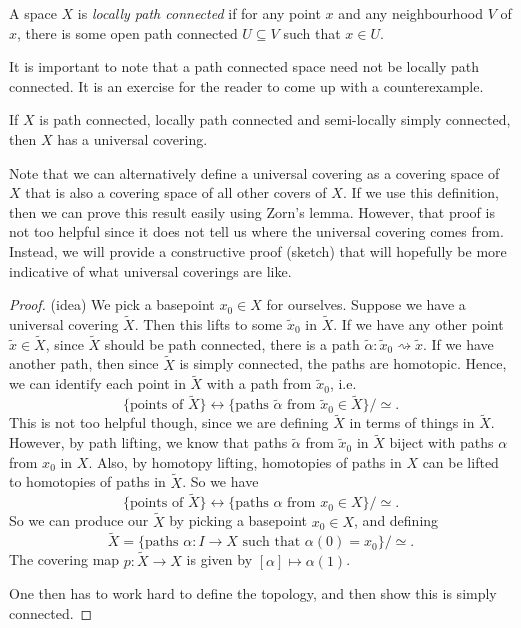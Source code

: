 \documentclass[a4paper]{article}
\begin{document}
\begin{defi}
  A space $X$ is \emph{locally path connected} if for any point $x$ and any neighbourhood $V$ of $x$, there is some open path connected $U \subseteq V$ such that $x \in U$.
\end{defi}

It is important to note that a path connected space need not be locally path connected. It is an exercise for the reader to come up with a counterexample.

\begin{thm}
  If $X$ is path connected, locally path connected and semi-locally simply connected, then $X$ has a universal covering.
\end{thm}
Note that we can alternatively define a universal covering as a covering space of $X$ that is also a covering space of all other covers of $X$. If we use this definition, then we can prove this result easily using Zorn's lemma. However, that proof is not too helpful since it does not tell us where the universal covering comes from. Instead, we will provide a constructive proof (sketch) that will hopefully be more indicative of what universal coverings are like.

\begin{proof}(idea)
  We pick a basepoint $x_0 \in X$ for ourselves. Suppose we have a universal covering $\tilde{X}$. Then this lifts to some $\tilde{x}_0$ in $\tilde{X}$. If we have any other point $\tilde{x} \in \tilde{X}$, since $\tilde{X}$ should be path connected, there is a path $\tilde{\alpha}: \tilde{x}_0 \rightsquigarrow \tilde{x}$. If we have another path, then since $\tilde{X}$ is simply connected, the paths are homotopic. Hence, we can identify each point in $\tilde{X}$ with a path from $\tilde{x}_0$, i.e.
  \[
    \{\text{points of }\tilde{X}\} \longleftrightarrow \{\text{paths }\tilde{\alpha}\text{ from }\tilde{x}_0\in \tilde{X}\}/{\simeq}.
  \]
  This is not too helpful though, since we are defining $\tilde{X}$ in terms of things in $\tilde{X}$. However, by path lifting, we know that paths $\tilde{\alpha}$ from $\tilde{x}_0$ in $\tilde{X}$ biject with paths $\alpha$ from $x_0$ in $X$. Also, by homotopy lifting, homotopies of paths in $X$ can be lifted to homotopies of paths in $\tilde{X}$. So we have
  \[
    \{\text{points of }\tilde{X}\} \longleftrightarrow \{\text{paths }\alpha\text{ from }x_0 \in X\}/{\simeq}.
  \]
  So we can produce our $\tilde{X}$ by picking a basepoint $x_0 \in X$, and defining
  \[
    \tilde{X} = \{\text{paths }\alpha: I\to X\text{ such that }\alpha(0) = x_0\}/{\simeq}.
  \]
  The covering map $p: \tilde{X} \to X$ is given by $[\alpha] \mapsto \alpha(1)$.

  One then has to work hard to define the topology, and then show this is simply connected. %
\end{proof}
\end{document}
